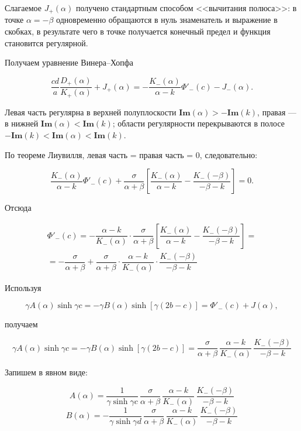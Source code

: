 \documentclass[a4paper,12pt]{article}
\begin{document}
Слагаемое $J_+(\alpha)$ получено стандартным способом <<вычитания полюса>>: в точке $\alpha = -\beta$ одновременно обращаются в нуль знаменатель и выражение в скобках, в результате чего в точке получается конечный предел и функция становится регулярной.

Получаем уравнение Винера--Хопфа

\begin{equation}
\dfrac{cd}{a}
\dfrac{D_+(\alpha)}{K_+(\alpha)}
+
J_+(\alpha)
=
-
\frac{K_-(\alpha) }{\alpha-k} \Phi'_-(c)
-
J_-(\alpha).
\end{equation}

Левая часть регулярна в верхней полуплоскости $\textbf{Im}(\alpha) > -\textbf{Im}(k)$, правая --- в нижней $\textbf{Im}(\alpha) < \textbf{Im}(k)$; области регулярности перекрываются в полосе $-\textbf{Im}(k) < \textbf{Im}(\alpha) < \textbf{Im}(k)$.

По теореме Лиувилля, левая часть = правая часть = 0, следовательно:

\begin{equation}
\frac{K_-(\alpha)}{\alpha - k}\Phi'_-(c)
+
\dfrac{\sigma}
{\alpha+\beta} \left[ \dfrac{K_-(\alpha)}{\alpha - k} - \dfrac{K_-(-\beta)}{-\beta - k} \right]
=
0.
\end{equation}

Отсюда

\begin{multline*}
\Phi'_-(c)
=
-\dfrac{\alpha - k}{K_-(\alpha)}\cdot\dfrac{\sigma}{\alpha + \beta}\left[ \dfrac{K_-(\alpha)}{\alpha - k} - \dfrac{K_-(-\beta)}{- \beta - k} \right] = \\ 
= - \dfrac{\sigma}{\alpha + \beta} + \dfrac{\sigma}{\alpha + \beta} \cdot \dfrac{\alpha - k}{K_-(\alpha)}\cdot \dfrac{K_-(-\beta)}{-\beta - k}
\end{multline*}

Используя

\[
\gamma A(\alpha)\sinh\gamma c
=
-\gamma B(\alpha)\sinh[\gamma(2b-c)]
=
\Phi'_-(c)+J(\alpha),
\]

получаем

\begin{equation}
\gamma A(\alpha)\sinh\gamma c =
-\gamma B(\alpha)\sinh[\gamma(2b-c)]
=\dfrac{\sigma}{\alpha + \beta} \, \dfrac{\alpha - k}{K_-(\alpha)} \,\dfrac{K_-(-\beta)}{- \beta - k}
\end{equation}

Запишем в явном виде:

\begin{equation}
\boxed{
    A(\alpha) = \dfrac{1}{\gamma \sinh{\gamma c}}\,\dfrac{\sigma}{\alpha + \beta}\,\dfrac{\alpha - k}{K_-(\alpha)}\,\dfrac{K_-(-\beta)}{- \beta - k}
    }
    \label{A1}
\end{equation}
\begin{equation}
\boxed{
    B(\alpha) = - \dfrac{1}{\gamma \sinh{\gamma d}}\,\dfrac{\sigma}{\alpha + \beta}\,\dfrac{\alpha - k}{K_-(\alpha)}\,\dfrac{K_-(-\beta)}{- \beta - k}
    }
    \label{B1}
\end{equation}
\end{document}
